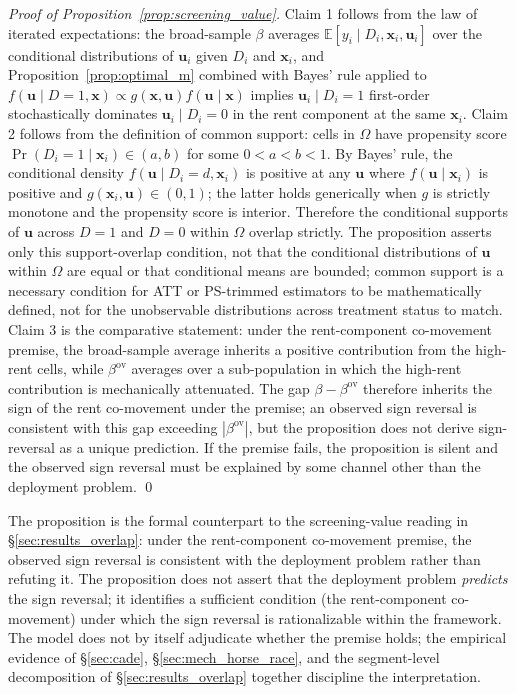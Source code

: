 \begin{proof}[Proof of Proposition~\ref{prop:screening_value}]
Claim 1 follows from the law of iterated expectations: the
broad-sample $\beta$ averages
$\mathbb{E}[y_i \mid D_i, \mathbf{x}_i, \mathbf{u}_i]$ over the
conditional distributions of $\mathbf{u}_i$ given $D_i$ and
$\mathbf{x}_i$, and Proposition~\ref{prop:optimal_m} combined
with Bayes' rule applied to
$f(\mathbf{u} \mid D=1, \mathbf{x}) \propto g(\mathbf{x},
\mathbf{u}) f(\mathbf{u} \mid \mathbf{x})$ implies
$\mathbf{u}_i \mid D_i=1$ first-order stochastically dominates
$\mathbf{u}_i \mid D_i=0$ in the rent component at the same
$\mathbf{x}_i$. Claim 2 follows from the definition of common
support: cells in $\Omega$ have propensity score
$\Pr(D_i=1 \mid \mathbf{x}_i) \in (a, b)$ for some
$0 < a < b < 1$. By Bayes' rule, the conditional density
$f(\mathbf{u} \mid D_i=d, \mathbf{x}_i)$ is positive at any
$\mathbf{u}$ where $f(\mathbf{u} \mid \mathbf{x}_i)$ is positive
and $g(\mathbf{x}_i, \mathbf{u}) \in (0,1)$; the latter holds
generically when $g$ is strictly monotone and the propensity
score is interior. Therefore the conditional supports of
$\mathbf{u}$ across $D=1$ and $D=0$ within $\Omega$ overlap
strictly. The proposition asserts only this support-overlap
condition, not that the conditional distributions of
$\mathbf{u}$ within $\Omega$ are equal or that conditional
means are bounded; common support is a necessary condition for
ATT or PS-trimmed estimators to be mathematically defined, not
for the unobservable distributions across treatment status to
match. Claim 3 is the comparative statement: under the
rent-component co-movement premise, the broad-sample average
inherits a positive contribution from the high-rent cells, while
$\beta^{\text{ov}}$ averages over a sub-population in which the
high-rent contribution is mechanically attenuated. The gap
$\beta - \beta^{\text{ov}}$ therefore inherits the sign of the
rent co-movement under the premise; an observed sign reversal is
consistent with this gap exceeding $|\beta^{\text{ov}}|$, but
the proposition does not derive sign-reversal as a unique
prediction. If the premise fails, the proposition is silent and
the observed sign reversal must be explained by some channel
other than the deployment problem. \qed
\end{proof}

The proposition is the formal counterpart to the screening-value
reading in \S\ref{sec:results_overlap}: under the rent-component
co-movement premise, the observed sign reversal is consistent
with the deployment problem rather than refuting it. The
proposition does not assert that the deployment problem
\emph{predicts} the sign reversal; it identifies a sufficient
condition (the rent-component co-movement) under which the sign
reversal is rationalizable within the framework. The model does
not by itself adjudicate whether the premise holds; the empirical
evidence of \S\ref{sec:cade}, \S\ref{sec:mech_horse_race}, and
the segment-level decomposition of \S\ref{sec:results_overlap}
together discipline the interpretation.

